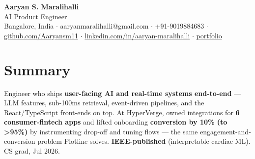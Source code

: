 \documentclass[10pt,a4paper]{article}
\begin{document}
\vspace*{-1cm}
\begin{center}
{\LARGE\bfseries Aaryan S. Maralihalli}\\[0.5em]
{\large AI Product Engineer}\\[0.3em]
Bangalore, India $\cdot$ aaryanmaralihalli@gmail.com $\cdot$ +91-9019884683 $\cdot$ \href{https://github.com/Aaryansm11}{github.com/Aaryansm11} $\cdot$ \href{https://linkedin.com/in/aaryan-maralihalli}{linkedin.com/in/aaryan-maralihalli} $\cdot$ \href{https://portfolio-zeta-ten-85.vercel.app}{portfolio}
\end{center}\vspace{0.4ex}
\section*{Summary}
Engineer who ships \textbf{user-facing AI and real-time systems end-to-end} --- LLM features, sub-100ms retrieval, event-driven pipelines, and the React/TypeScript front-ends on top. At HyperVerge, owned integrations for \textbf{6 consumer-fintech apps} and lifted onboarding \textbf{conversion by 10\% (to \textgreater{}95\%)} by instrumenting drop-off and tuning flows --- the same engagement-and-conversion problem Plotline solves. \textbf{IEEE-published} (interpretable cardiac ML). CS grad, Jul 2026.\par\vspace{2pt}
\end{document}
